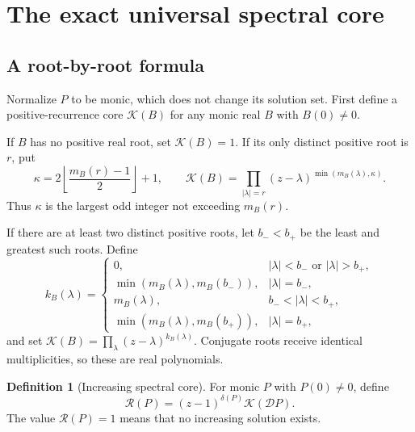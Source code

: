 \documentclass[11pt,letterpaper]{article}
\theoremstyle{definition}
\newtheorem{definition}[theorem]{Definition}
\theoremstyle{remark}
\newcommand{\scD}{\mathcal D}
\newcommand{\core}{\mathcal R}
\newcommand{\pcore}{\mathcal K}
\begin{document}
\section{The exact universal spectral core}
\label{nrr:sc:sec:core}

\subsection{A root-by-root formula}

Normalize $P$ to be monic, which does not change its solution set.
First define a positive-recurrence core $\pcore(B)$ for any monic real
$B$ with $B(0)\ne0$.

If $B$ has no positive real root, set $\pcore(B)=1$.
If its only distinct positive root is $r$, put
\begin{equation}
 \kappa=2\left\lfloor\frac{m_B(r)-1}{2}\right\rfloor+1,
 \qquad
 \pcore(B)=\prod_{|\lambda|=r}
       (z-\lambda)^{\min(m_B(\lambda),\kappa)}.
 \label{nrr:sc:eq:onecore}
\end{equation}
Thus $\kappa$ is the largest odd integer not exceeding $m_B(r)$.

If there are at least two distinct positive roots, let $b_-<b_+$ be the
least and greatest such roots. Define
\begin{equation}
 k_B(\lambda)=
 \begin{cases}
 0,&|\lambda|<b_-\text{ or }|\lambda|>b_+,\\
 \min(m_B(\lambda),m_B(b_-)),&|\lambda|=b_-,\\
 m_B(\lambda),&b_-<|\lambda|<b_+,\\
 \min(m_B(\lambda),m_B(b_+)),&|\lambda|=b_+,
 \end{cases}
 \label{nrr:sc:eq:annularcore}
\end{equation}
and set $\pcore(B)=\prod_\lambda(z-\lambda)^{k_B(\lambda)}$.
Conjugate roots receive identical multiplicities, so these are real
polynomials.

\begin{definition}[Increasing spectral core]
\label{nrr:sc:def:core}
For monic $P$ with $P(0)\ne0$, define
\begin{equation}
 \boxed{\quad\core(P)=(z-1)^{\delta(P)}\pcore(\scD P).\quad}
 \label{nrr:sc:eq:core}
\end{equation}
The value $\core(P)=1$ means that no increasing solution exists.
\end{definition}
\end{document}
